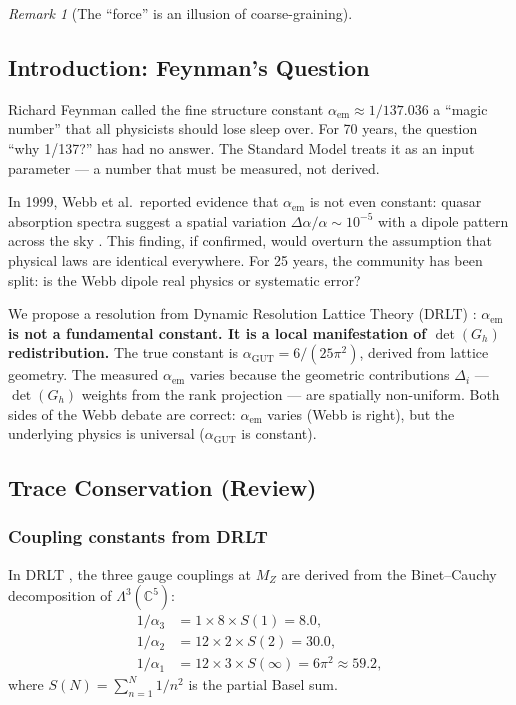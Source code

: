 \documentclass[12pt]{article}
\theoremstyle{remark}
\newtheorem{remark}[theorem]{Remark}
\theoremstyle{definition}
\newcommand{\CC}{\mathbb{C}}
\newcommand{\agut}{\alpha_{\mathrm{GUT}}}
\begin{document}
\begin{remark}[The ``force'' is an illusion of coarse-graining]
\subsection{Introduction: Feynman's Question}

Richard Feynman called the fine structure constant $\alpha_\text{em} \approx 1/137.036$ a ``magic number'' that all physicists should lose sleep over. For 70 years, the question ``why 1/137?'' has had no answer. The Standard Model treats it as an input parameter --- a number that must be measured, not derived.

In 1999, Webb et al.\ reported evidence that $\alpha_\text{em}$ is not even constant: quasar absorption spectra suggest a spatial variation $\Delta\alpha/\alpha \sim 10^{-5}$ with a dipole pattern across the sky \cite{Webb}. This finding, if confirmed, would overturn the assumption that physical laws are identical everywhere. For 25 years, the community has been split: is the Webb dipole real physics or systematic error?

We propose a resolution from Dynamic Resolution Lattice Theory (DRLT) : \textbf{$\alpha_\text{em}$ is not a fundamental constant. It is a local manifestation of $\det(G_h)$ redistribution.} The true constant is $\agut = 6/(25\pi^2)$, derived from lattice geometry. The measured $\alpha_\text{em}$ varies because the geometric contributions $\Delta_i$ --- $\det(G_h)$ weights from the rank projection --- are spatially non-uniform. Both sides of the Webb debate are correct: $\alpha_\text{em}$ varies (Webb is right), but the underlying physics is universal ($\agut$ is constant).

\subsection{Trace Conservation (Review)}

\subsubsection{Coupling constants from DRLT}

In DRLT , the three gauge couplings at $M_Z$ are derived from the Binet--Cauchy decomposition of $\Lambda^3(\CC^5)$:
\begin{align}
1/\alpha_3 &= 1 \times 8 \times S(1) = 8.0, \\
1/\alpha_2 &= 12 \times 2 \times S(2) = 30.0, \\
1/\alpha_1 &= 12 \times 3 \times S(\infty) = 6\pi^2 \approx 59.2,
\end{align}
where $S(N) = \sum_{n=1}^{N} 1/n^2$ is the partial Basel sum.


\end{remark}
\end{document}

